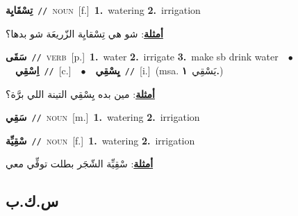 \documentclass[10pt,a4paper,twoside]{article} %
\begin{document}
\begin{multicols}{2}
{\setlength\topsep{0pt}\textbf{\foreignlanguage{arabic}{تِسْقَايِة}}\ {\color{gray}\texttt{//}\color{black}}\ \textsc{noun}\ [f.]\ \textbf{1.}~watering  \textbf{2.}~irrigation\  \begin{flushright}\color{gray}\foreignlanguage{arabic}{\textbf{\underline{\foreignlanguage{arabic}{أمثلة}}}: شو هي تِسْقايِة الزّريعَة شو بدها؟}\end{flushright}\color{black}} \vspace{2mm}

{\setlength\topsep{0pt}\textbf{\foreignlanguage{arabic}{سَقَى}}\ {\color{gray}\texttt{//}\color{black}}\ \textsc{verb}\ [p.]\ \textbf{1.}~water  \textbf{2.}~irrigate  \textbf{3.}~make sb drink water\ \ $\bullet$\ \ \setlength\topsep{0pt}\textbf{\foreignlanguage{arabic}{اِسْقِي}}\ {\color{gray}\texttt{//}\color{black}}\ [c.]\ \ $\bullet$\ \ \setlength\topsep{0pt}\textbf{\foreignlanguage{arabic}{يِسْقِي}}\ {\color{gray}\texttt{//}\color{black}}\ [i.]\ \color{gray}(msa. \foreignlanguage{arabic}{يَسْقِي}~\foreignlanguage{arabic}{\textbf{١.}})\color{black}\  \begin{flushright}\color{gray}\foreignlanguage{arabic}{\textbf{\underline{\foreignlanguage{arabic}{أمثلة}}}: مين بده يِسْقِي التينة اللي برَّة؟}\end{flushright}\color{black}} \vspace{2mm}

{\setlength\topsep{0pt}\textbf{\foreignlanguage{arabic}{سَقِي}}\ {\color{gray}\texttt{//}\color{black}}\ \textsc{noun}\ [m.]\ \textbf{1.}~watering  \textbf{2.}~irrigation\ } \vspace{2mm}

{\setlength\topsep{0pt}\textbf{\foreignlanguage{arabic}{سْقِيِّة}}\ {\color{gray}\texttt{//}\color{black}}\ \textsc{noun}\ [f.]\ \textbf{1.}~watering  \textbf{2.}~irrigation\  \begin{flushright}\color{gray}\foreignlanguage{arabic}{\textbf{\underline{\foreignlanguage{arabic}{أمثلة}}}: سْقِيِّة الشّجَر بطلت توفِّي معي}\end{flushright}\color{black}} \vspace{2mm}

\vspace{-3mm}
\subsection*{\color{blue}\foreignlanguage{arabic}{س.ك.ب}\color{blue}{}} 


\end{multicols}
\end{document}
